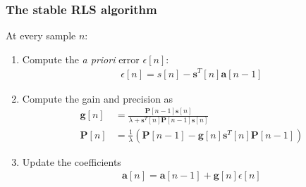 \documentclass{beamer}
\begin{document}
\begin{frame}
  \frametitle{The stable RLS algorithm}

  At every sample $n$:
  \begin{enumerate}
  \item Compute the \textit{a priori} error $\epsilon[n]$:
    \begin{align*}
      \epsilon[n] = s[n] - \mathbf{s}^T[n]\mathbf{a}[n-1]
    \end{align*}
  \item Compute the gain and precision as
    \begin{align*}
      \mathbf{g}[n] &=
      \frac{\mathbf{P}[n-1]\mathbf{s}[n]}{\lambda+\mathbf{s}^T[n]\mathbf{P}[n-1]\mathbf{s}[n]}\\
      \mathbf{P}[n] &=\frac{1}{\lambda}\left(\mathbf{P}[n-1]
      -\mathbf{g}[n]\mathbf{s}^T[n]\mathbf{P}[n-1]\right)
    \end{align*}
  \item Update the coefficients
    \begin{align*}
      \mathbf{a}[n] = \mathbf{a}[n-1]+\mathbf{g}[n]\epsilon[n]
    \end{align*}
  \end{enumerate}
\end{frame}
\end{document}
